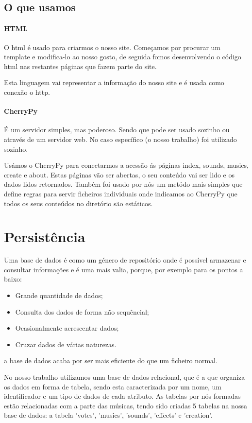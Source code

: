 \section{O que usamos}
\subsubsection{HTML}
O \ac{html} é usado para criarmos o nosso site. Começamos por procurar um template e modifica-lo ao nosso gosto, de seguida fomos desenvolvendo o código \ac{html} nas restantes páginas que fazem parte do site. 

Esta linguagem vai representar a informação do nosso site e é usada como conexão o \ac{http}. 
\subsubsection{CherryPy}
É um servidor simples, mas poderoso. Sendo que pode ser usado sozinho ou através de um servidor web. No caso específico (o nosso trabalho) foi utilizado sozinho. 

Usámos o CherryPy para conectarmos a acessão ás páginas index, sounds, musics, create e about. Estas páginas vão ser abertas, o seu conteúdo vai ser lido e os dados lidos retornados. Também foi usado por nós um metódo mais simples que define regras para servir ficheiros individuais onde indicamos ao CherryPy que todos os seus conteúdos no diretório são estáticos. 
\chapter{Persistência}	
\label{chap.persistência}
Uma base de dados é como um género de repositório onde é possível armazenar e consultar informações e é uma mais valia, porque, por exemplo para os pontos a baixo:
\begin{itemize}
	\item Grande quantidade de dados;
	\item Consulta dos dados de forma não sequêncial;
	\item Ocasionalmente acrescentar dados; 
	\item Cruzar dados de várias naturezas.
\end{itemize}
a base de dados acaba por ser mais eficiente do que um ficheiro normal. 

No nosso trabalho utilizamos uma base de dados relacional, que é a que organiza os dados em forma de tabela, sendo esta caracterizada por um nome, um identificador e um tipo de dados de cada atributo. As tabelas por nós formadas estão relacionadas com a parte das músicas, tendo sido criadas 5 tabelas na nossa base de dados: a tabela 'votes', 'musics', 'sounds', 'effects' e 'creation'.

